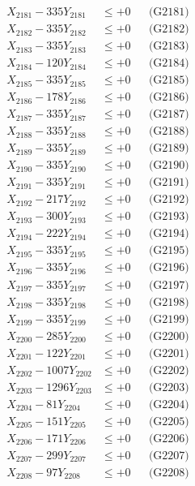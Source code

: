 \documentclass[a4paper,10pt]{article}
\begin{document}
{\begin{align}
\allowbreak
X_{2181} - 335Y_{2181} &\leq +0 && \text{(G2181)} \\
X_{2182} - 335Y_{2182} &\leq +0 && \text{(G2182)} \\
X_{2183} - 335Y_{2183} &\leq +0 && \text{(G2183)} \\
X_{2184} - 120Y_{2184} &\leq +0 && \text{(G2184)} \\
X_{2185} - 335Y_{2185} &\leq +0 && \text{(G2185)} \\
X_{2186} - 178Y_{2186} &\leq +0 && \text{(G2186)} \\
X_{2187} - 335Y_{2187} &\leq +0 && \text{(G2187)} \\
X_{2188} - 335Y_{2188} &\leq +0 && \text{(G2188)} \\
X_{2189} - 335Y_{2189} &\leq +0 && \text{(G2189)} \\
X_{2190} - 335Y_{2190} &\leq +0 && \text{(G2190)} \\
\allowbreak
X_{2191} - 335Y_{2191} &\leq +0 && \text{(G2191)} \\
X_{2192} - 217Y_{2192} &\leq +0 && \text{(G2192)} \\
X_{2193} - 300Y_{2193} &\leq +0 && \text{(G2193)} \\
X_{2194} - 222Y_{2194} &\leq +0 && \text{(G2194)} \\
X_{2195} - 335Y_{2195} &\leq +0 && \text{(G2195)} \\
X_{2196} - 335Y_{2196} &\leq +0 && \text{(G2196)} \\
X_{2197} - 335Y_{2197} &\leq +0 && \text{(G2197)} \\
X_{2198} - 335Y_{2198} &\leq +0 && \text{(G2198)} \\
X_{2199} - 335Y_{2199} &\leq +0 && \text{(G2199)} \\
X_{2200} - 285Y_{2200} &\leq +0 && \text{(G2200)} \\
\allowbreak
X_{2201} - 122Y_{2201} &\leq +0 && \text{(G2201)} \\
X_{2202} - 1007Y_{2202} &\leq +0 && \text{(G2202)} \\
X_{2203} - 1296Y_{2203} &\leq +0 && \text{(G2203)} \\
X_{2204} - 81Y_{2204} &\leq +0 && \text{(G2204)} \\
X_{2205} - 151Y_{2205} &\leq +0 && \text{(G2205)} \\
X_{2206} - 171Y_{2206} &\leq +0 && \text{(G2206)} \\
X_{2207} - 299Y_{2207} &\leq +0 && \text{(G2207)} \\
X_{2208} - 97Y_{2208} &\leq +0 && \text{(G2208)} \\

\end{align}}
\end{document}
